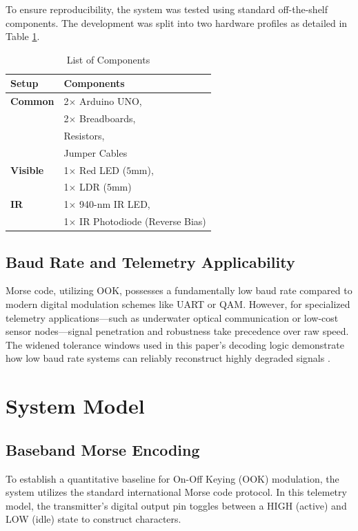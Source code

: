 \documentclass[conference]{IEEEtran}
\begin{document}
To ensure reproducibility, the system was tested using standard off-the-shelf components. The development was split into two hardware profiles as detailed in Table \ref{tab:components}.
\begin{table}[htbp]
\caption{List of Components}
\label{tab:components}
\centering
\begin{tabular}{|l|l|}
\hline
\textbf{Setup} & \textbf{Components} \\ \hline
\textbf{Common} & 2$\times$ Arduino UNO, \\
&  2$\times$ Breadboards, \\
& Resistors, \\
& Jumper Cables \\ \hline
\textbf{Visible} & 1$\times$ Red LED ($5\text{mm}$), \\
& 1$\times$ LDR ($5\text{mm}$) \\ \hline
\textbf{IR} & 1$\times$ 940-nm IR LED, \\
& 1$\times$ IR Photodiode (Reverse Bias) \\ \hline
\end{tabular}
\end{table}

\subsection{Baud Rate and Telemetry Applicability}
Morse code, utilizing OOK, possesses a fundamentally low baud rate compared to modern digital modulation schemes like UART or QAM. However, for specialized telemetry applications—such as underwater optical communication or low-cost sensor nodes—signal penetration and robustness take precedence over raw speed. The widened tolerance windows used in this paper's decoding logic demonstrate how low baud rate systems can reliably reconstruct highly degraded signals \cite{uysal2015}.

\section{System Model}
\subsection{Baseband Morse Encoding}
To establish a quantitative baseline for On-Off Keying (OOK) modulation, the system utilizes the standard international Morse code protocol. In this telemetry model, the transmitter's digital output pin toggles between a HIGH (active) and LOW (idle) state to construct characters. 
\end{document}
